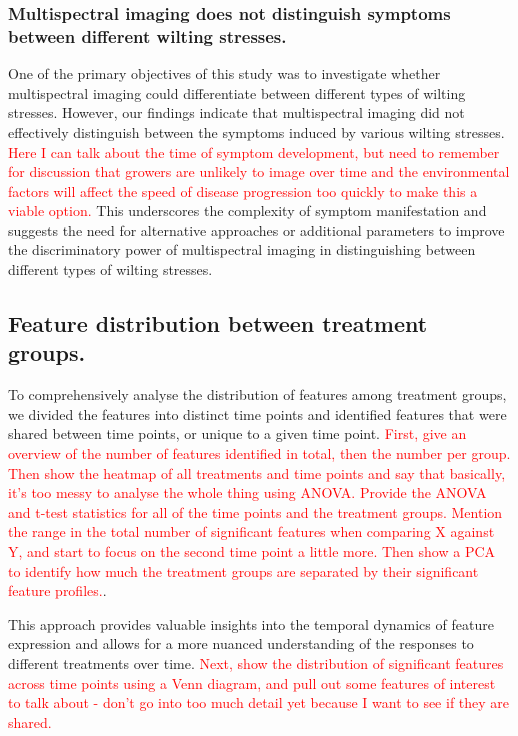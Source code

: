 \subsubsection{Multispectral imaging does not distinguish symptoms between different wilting stresses.}

One of the primary objectives of this study was to investigate whether multispectral imaging could differentiate between different types of wilting stresses. However, our findings indicate that multispectral imaging did not effectively distinguish between the symptoms induced by various wilting stresses. \textcolor{red}{Here I can talk about the time of symptom development, but need to remember for discussion that growers are unlikely to image over time and the environmental factors will affect the speed of disease progression too quickly to make this a viable option.}
This underscores the complexity of symptom manifestation and suggests the need for alternative approaches or additional parameters to improve the discriminatory power of multispectral imaging in distinguishing between different types of wilting stresses.

\subsection{Feature distribution between treatment groups.}

To comprehensively analyse the distribution of features among treatment groups, we divided the features into distinct time points and identified features that were shared between time points, or unique to a given time point. \textcolor{red}{First, give an overview of the number of features identified in total, then the number per group. Then show the heatmap of all treatments and time points and say that basically, it's too messy to analyse the whole thing using ANOVA. Provide the ANOVA and t-test statistics for all of the time points and the treatment groups. Mention the range in the total number of significant features when comparing X against Y, and start to focus on the second time point a little more.  Then show a PCA to identify how much the treatment groups are separated by their significant feature profiles.}. 

This approach provides valuable insights into the temporal dynamics of feature expression and allows for a more nuanced understanding of the responses to different treatments over time. \textcolor{red}{Next, show the distribution of significant features across time points using a Venn diagram, and pull out some features of interest to talk about - don't go into too much detail yet because I want to see if they are shared.}


